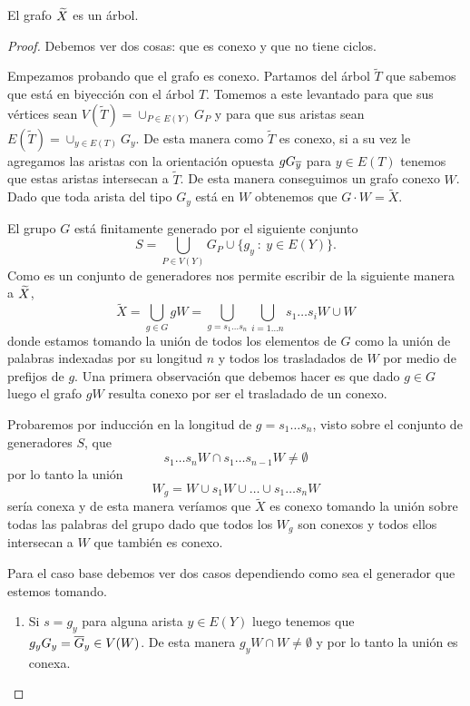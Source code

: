 \documentclass[tesis.tex]{subfiles}
\begin{document}
\begin{teo}[Serre]
	El grafo $\widetilde X$ es un árbol.
\end{teo}
\begin{proof}
	Debemos ver dos cosas: que es conexo y que no tiene ciclos.
	
	Empezamos probando que el grafo es conexo.
	Partamos del árbol $\widetilde T$ que sabemos que está en biyección con el árbol $T$.
	Tomemos a este levantado para que sus vértices sean $V(\widetilde T) = \cup_{P \in E(Y)} G_{P}$ y para que sus aristas sean $E(\widetilde T) =\cup_{y \in E(T)} G_{y}$.
	De esta manera como $\widetilde T$ es conexo, si a su vez le agregamos las aristas con la orientación opuesta $gG_{\overline y}$ para $y \in E(T)$ tenemos que estas aristas intersecan a $\tilde T$.
	De esta manera conseguimos un grafo conexo $W$.
	Dado que toda arista del tipo $G_y$ está en $W$ obtenemos que $G \cdot W = \tilde X$.
	
	El grupo $G$ está finitamente generado por el siguiente conjunto
	\[
		S = \bigcup_{P \in V(Y)} G_{P} \cup \{ g_y \ : \ y \in E(Y) \}.   
	\] 
	Como es un conjunto de generadores nos permite escribir de la siguiente manera a $\widetilde X$, 
	\[
		\tilde X = \bigcup_{g \in G} gW = \bigcup_{g=s_1 \dots s_n} \bigcup_{i=1 \dots n} s_{1}\dots s_{i} W  \cup W 
	\]  
	donde estamos tomando la unión de todos los elementos de $G$ como la unión de palabras indexadas por su longitud $n$ y todos los trasladados de $W$ por medio de prefijos de $g$.
	Una primera observación que debemos hacer es que dado $g \in G$ luego el grafo $gW$ resulta conexo por ser el trasladado de un conexo.
	
	Probaremos por inducción en la longitud de $g=s_1\dots s_n$, visto sobre el conjunto de generadores $S$, que 
	\[
		s_1\dots s_n W \cap s_1 \dots s_{n-1}W \neq \emptyset	
	\] 
	por lo tanto la unión 
	\[
	W_g = W \cup s_1W \cup \dots \cup s_1\dots s_{n}W
	\]
	sería conexa y de esta manera veríamos que $\tilde X$ es conexo tomando la unión sobre todas las palabras del grupo dado que todos los $W_g$ son conexos y todos ellos intersecan a $W$ que también es  conexo.
	
	Para el caso base debemos ver dos casos dependiendo como sea el generador que estemos tomando.
	\begin{enumerate}
		\item Si $s=g_y$ para alguna arista $y \in E(Y)$ luego tenemos que $g_yG_y = \overline G_y \in V(W)$.
		De esta manera $g_yW \cap W \neq \emptyset$ y por lo tanto la unión es conexa.		
		

\end{enumerate}
\end{proof}
\end{document}
